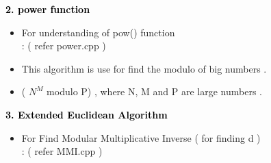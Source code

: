 \documentclass{article}
\begin{document}
\centering\textbf{{\LARGE \bf \textcolor{black}{2. power function}\\}}
\vspace{1cm}

\begin{itemize}
\item For understanding of pow() function \\: ( refer power.cpp )
\end{itemize}

\begin{tcolorbox}

\begin{itemize}
\item This algorithm is use for find the modulo of big numbers .
\item ( \(N^M\) modulo P) , where N, M and P are large numbers .\\
\end{itemize}
\end{tcolorbox}
\pagebreak

\centering\textbf{{\LARGE \bf \textcolor{black}{3. Extended Euclidean Algorithm}\\}}
\vspace{1cm}              


\begin{itemize}
\item For Find Modular Multiplicative Inverse ( for finding d )\\ : ( refer MMI.cpp )\\
\end{itemize}
\end{document}
